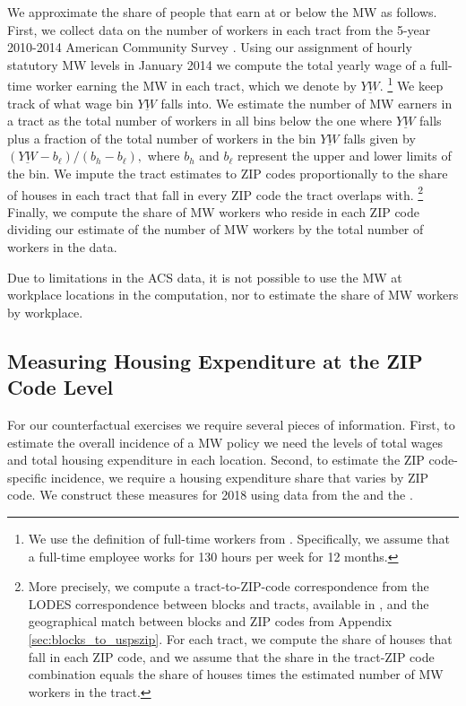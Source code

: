 We approximate the share of people that earn at or below the MW as follows.
First, we collect data on the number of workers in each tract from the 5-year 
2010-2014 American Community Survey \parencite{CensusACS}.
Using our assignment of hourly statutory MW levels in January 2014 we compute 
the total yearly wage of a full-time worker earning the MW in each tract, which 
we denote by $\underline{YW}$.%
\footnote{We use the definition of full-time workers from \textcite{IRSfulltime}.
Specifically, we assume that a full-time employee works for 130 hours per week
for 12 months.}
We keep track of what wage bin $\underline{YW}$ falls into.
We estimate the number of MW earners in a tract as the total number of workers 
in all bins below the one where $\underline{YW}$ falls plus a fraction of the 
total number of workers in the bin $\underline{YW}$ falls given by 
$\left(\underline{YW} - b_\ell\right)/\left(b_h - b_\ell\right),$
where $b_h$ and $b_\ell$ represent the upper and lower limits of 
the bin.
We impute the tract estimates to ZIP codes proportionally to the share of 
houses in each tract that fall in every ZIP code the tract overlaps with.%
\footnote{More precisely, we compute a tract-to-ZIP-code correspondence from
the LODES correspondence between blocks and tracts, available in 
\textcite{CensusLODES}, and the geographical match between blocks and ZIP codes
from Appendix \ref{sec:blocks_to_uspszip}.
For each tract, we compute the share of houses that fall in each ZIP code, and 
we assume that the share in the tract-ZIP code combination equals the share of
houses times the estimated number of MW workers in the tract.}
Finally, we compute the share of MW workers who reside in each ZIP 
code dividing our estimate of the number of MW workers by the total
number of workers in the data.

Due to limitations in the ACS data, it is not possible to use the MW at 
workplace locations in the computation, nor to estimate the share of MW workers 
by workplace.

\subsection{Measuring Housing Expenditure at the ZIP Code Level}
\label{sec:measure_housing_expenditure}

For our counterfactual exercises we require several pieces of information.
First, to estimate the overall incidence of a MW policy we need the levels 
of total wages and total housing expenditure in each location.
Second, to estimate the ZIP code-specific incidence, we require a housing 
expenditure share that varies by ZIP code.
We construct these measures for 2018 using data from the \textcite{IRS} and
the \textcite{hudSAFMR}.

